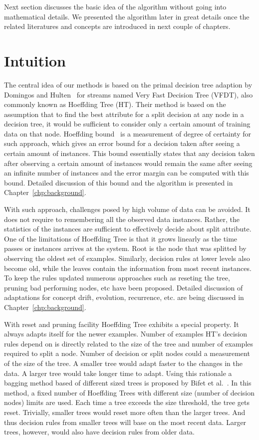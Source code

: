 Next section discusses the basic idea of the algorithm without going into mathematical details. We presented the algorithm later in great details once the related literatures and concepts are introduced in next couple of chapters.

\section{Intuition}
The central idea of our methods is based on the primal decision tree adaption by Domingos and Hulten~\cite{domingos00:vfdt} for streams named Very Fast Decision Tree (VFDT), also commonly known as Hoeffding Tree (HT). Their method is based on the assumption that to find the best attribute for a split decision at any node in a decision tree, it would be sufficient to consider only a certain amount of training data on that node. Hoeffding bound~\cite{hoeffding63:bound} is a measurement of degree of certainty for such approach, which gives an error bound for a decision taken after seeing a certain amount of instances. This bound essentially states that any decision taken after observing a certain amount of instances would remain the same after seeing an infinite number of instances and the error margin can be computed with this bound. Detailed discussion of this bound and the algorithm is presented in Chapter~\ref{chp:background}.

With such approach, challenges posed by high volume of data can be avoided. It does not require to remembering all the observed data instances. Rather, the statistics of the instances are sufficient to effectively decide about split attribute. One of the limitations of Hoeffding Tree is that it grows linearly as the time passes or instances arrives at the system. Root is the node that was splitted by observing the oldest set of examples. Similarly, decision rules at lower levels also become old, while the leaves contain the information from most recent instances. To keep the rules updated numerous approaches such as reseting the tree, pruning bad performing nodes, etc have been proposed. Detailed discussion of adaptations for concept drift, evolution, recurrence, etc. are being discussed in Chapter~\ref{chp:background}.

With reset and pruning facility Hoeffding Tree exhibits a special property. It always adapts itself for the newer examples. Number of examples HT's decision rules depend on is directly related to the size of the tree and number of examples required to split a node. Number of decision or split nodes could a measurement of the size of the tree. A smaller tree would adapt faster to the changes in the data. A larger tree would take longer time to adapt. Using this rationale a bagging method based of different sized trees is proposed by Bifet et al.~\cite{bifet09:asht}. In this method, a fixed number of Hoeffding Trees with different size (number of decision nodes) limits are used. Each time a tree exceeds the size threshold, the tree gets reset. Trivially, smaller trees would reset more often than the larger trees. And thus decision rules from smaller trees will base on the most recent data. Larger trees, however, would also have decision rules from older data.

